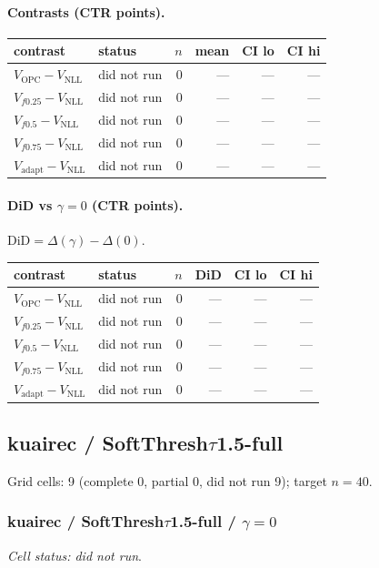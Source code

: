 \documentclass[10pt,a4paper]{article}
\begin{document}
\paragraph{Contrasts (CTR points).}
{\centering\small\begin{tabular}{llrrrr}
\toprule contrast & status & $n$ & mean & CI lo & CI hi \\
\midrule
$V_{\mathrm{OPC}}-V_{\mathrm{NLL}}$ & did not run & 0 & --- & --- & --- \\
$V_{f0.25}-V_{\mathrm{NLL}}$ & did not run & 0 & --- & --- & --- \\
$V_{f0.5}-V_{\mathrm{NLL}}$ & did not run & 0 & --- & --- & --- \\
$V_{f0.75}-V_{\mathrm{NLL}}$ & did not run & 0 & --- & --- & --- \\
$V_{\mathrm{adapt}}-V_{\mathrm{NLL}}$ & did not run & 0 & --- & --- & --- \\
\bottomrule\end{tabular}\par}
\paragraph{DiD vs $\gamma=0$ (CTR points).} $\mathrm{DiD}=\Delta(\gamma)-\Delta(0)$.
{\centering\small\begin{tabular}{llrrrr}
\toprule contrast & status & $n$ & DiD & CI lo & CI hi \\
\midrule
$V_{\mathrm{OPC}}-V_{\mathrm{NLL}}$ & did not run & 0 & --- & --- & --- \\
$V_{f0.25}-V_{\mathrm{NLL}}$ & did not run & 0 & --- & --- & --- \\
$V_{f0.5}-V_{\mathrm{NLL}}$ & did not run & 0 & --- & --- & --- \\
$V_{f0.75}-V_{\mathrm{NLL}}$ & did not run & 0 & --- & --- & --- \\
$V_{\mathrm{adapt}}-V_{\mathrm{NLL}}$ & did not run & 0 & --- & --- & --- \\
\bottomrule\end{tabular}\par}
\bigskip
\newpage
\subsection{kuairec / SoftThresh$\tau$1.5-full}
Grid cells: 9 (complete 0, partial 0, did not run 9); target $n=40$.
\subsubsection{kuairec / SoftThresh$\tau$1.5-full / $\gamma=0$}
\emph{Cell status: did not run}.
\end{document}
